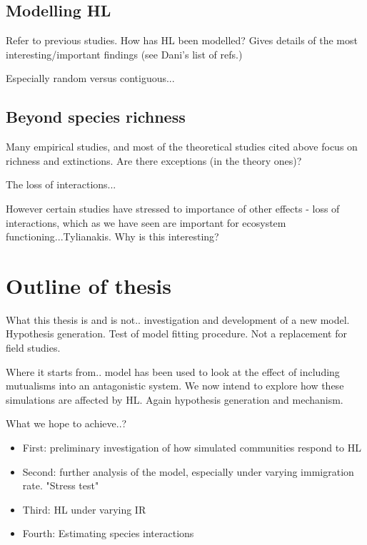\subsection{Modelling HL}
\label{sec:intro_modelling_HL}

Refer to previous studies. How has HL been modelled? Gives details of the most interesting/important findings (see Dani's list of refs.)

Especially random versus contiguous...

\subsection{Beyond species richness}
\label{sec:intro_beyond}

Many empirical studies, and most of the theoretical studies cited above focus on richness and extinctions. Are there exceptions (in the theory ones)?

The loss of interactions...

However certain studies have stressed to importance of other effects - loss of interactions, which as we have seen are important for ecosystem functioning...Tylianakis. Why is this interesting?

\section{Outline of thesis}
\label{sec:intro_outline}

What this thesis is and is not.. investigation and development of a new model. Hypothesis generation. Test of model fitting procedure. Not a replacement for field studies.

Where it starts from.. model has been used to look at the effect of including mutualisms into an antagonistic system. We now intend to explore how these simulations are affected by HL. Again hypothesis generation and mechanism.

What we hope to achieve..?

\begin{itemize}
	\item First: preliminary investigation of how simulated communities respond to HL
	\item Second: further analysis of the model, especially under varying immigration rate. "Stress test"
	\item Third: HL under varying IR
	\item Fourth: Estimating species interactions
\end{itemize}


